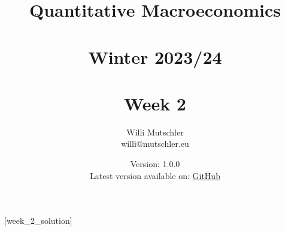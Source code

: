 
\newif\ifDisplaySolutions%


\title{Quantitative Macroeconomics\\~\\Winter 2023/24\\~\\Week 2}
\author{Willi Mutschler\\willi@mutschler.eu}
\date{Version: 1.0.0\\Latest version available on: \href{https://github.com/wmutschl/Quantitative-Macroeconomics/releases/latest/download/week_2.pdf}{GitHub}}
\maketitle\thispagestyle{empty}

\newpage
{}[week_2_solution]
\tableofcontents\thispagestyle{empty}\newpage

\setcounter{page}{1}
\newpage
\newpage
\newpage
\printbibliography
\newpage

\ifDisplaySolutions
\newpage
\appendix
\section{Solutions}

\fi
